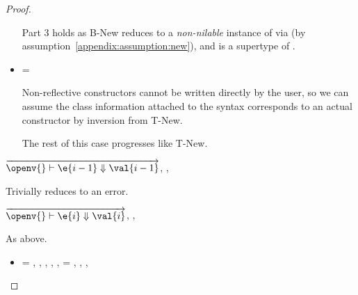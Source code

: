 \begin{lemma}
\begin{proof}
\begin{case}[B-New]
\begin{itemize}
\begin{subcase}[T-New]
Part 3 holds as B-New reduces to a \emph{non-nilable}
instance of \class{} via \newjavaliteral (by assumption~\ref{appendix:assumption:new}), 
and {\ty{}} is a supertype of \javatotcexp{\classhint{}}.

\end{subcase}
\item[]
\begin{subcase}[T-NewStatic]
  {\ep{}} = { {\classhint{}}
                                                          {\class{}} {}}

  Non-reflective constructors cannot be written directly by the user, so we can assume
  the class information attached to the syntax corresponds to an actual constructor by inversion
  from T-New.

  The rest of this case progresses like T-New.
\end{subcase}
\end{itemize}
\end{case}

\begin{case}[BE-New1] $\overrightarrow{
  \opsem {\openv{}}
         {\e{i-1}}
         {\val{i-1}}
       }$,
  \opsem {\openv{}}
         {}
         {\errorvalv{}},
  \opsem {\openv{}} {\e{}} {\errorvalv{}}

        Trivially reduces to an error.

\end{case}

\begin{case}[BE-New2] 
  $\overrightarrow{
  \opsem {\openv{}}
         {\e{i}}
         {\val{i}}
       }$,
                  {}
                  {}
                  {\errorvalv{}},
        \opsem {\openv{}} {\e{}} {\errorvalv{}}

        As above.

\end{case}

\begin{case}[B-Field]
  \opsem {\openv{}}
         {} 
         { {\classfieldpair{\fld{}} {\val{}}}}

\begin{itemize}
  \item[]
\begin{subcase}[T-Field]
  \ep{} = {\fieldexp {\fld{}} {}},
  \judgementtworewrite {\propenv{}} {\ep{}} {\s{}} {\e{}},
  \issubtypein{}{\s{}}{\Object{}},
  ,
  ,
  \e{} = { {} {\fld{}} {}}
  ,
  \inpropenv{\topprop{}}{\thenprop{\prop{}}},
  \inpropenv{\topprop{}}{\elseprop{\prop{}}},
  \issubobjin{}{\emptyobject{}}{\object{}}



\end{subcase}
\end{itemize}
\end{case}
\end{proof}
\end{lemma}
